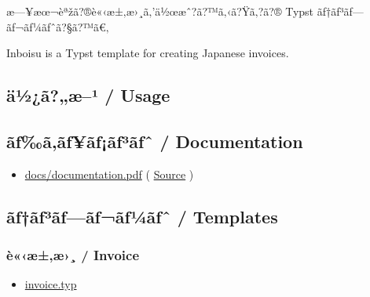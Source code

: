 \label{readme}
æ---¥æœ¬èªžã?®è«‹æ±‚æ›¸ã‚'ä½œæˆ?ã?™ã‚‹ã?Ÿã‚?ã?® Typst
ãƒ†ãƒ³ãƒ---ãƒ¬ãƒ¼ãƒˆã?§ã?™ã€‚

Inboisu is a Typst template for creating Japanese invoices.

\subsection{ä½¿ã?„æ--¹ / Usage}\label{uxe4uxbduxe3uxe6uxb9-usage}

\begin{Shaded}
\begin{Highlighting}[]

\NormalTok{)}
\end{Highlighting}
\end{Shaded}

\subsection{ãƒ‰ã‚­ãƒ¥ãƒ¡ãƒ³ãƒˆ /
Documentation}\label{uxe3ux192uxe3uxe3ux192uxe3ux192uxe3ux192uxb3uxe3ux192ux2c6-documentation}

\begin{itemize}
\tightlist
\item
  \href{https://github.com/typst/packages/raw/main/packages/preview/inboisu/0.1.0/docs/documentation.pdf}{docs/documentation.pdf}
  (
  \href{https://github.com/typst/packages/raw/main/packages/preview/inboisu/0.1.0/docs/docs.typ}{Source}
  )
\end{itemize}

\subsection{ãƒ†ãƒ³ãƒ---ãƒ¬ãƒ¼ãƒˆ /
Templates}\label{uxe3ux192uxe3ux192uxb3uxe3ux192uxe3ux192uxe3ux192uxbcuxe3ux192ux2c6-templates}

\subsubsection{è«‹æ±‚æ›¸ / Invoice}\label{uxe8uxe6uxe6-invoice}


\begin{itemize}
\tightlist
\item
  \href{https://github.com/typst/packages/raw/main/packages/preview/inboisu/0.1.0/template/invoice.typ}{invoice.typ}
\end{itemize}

